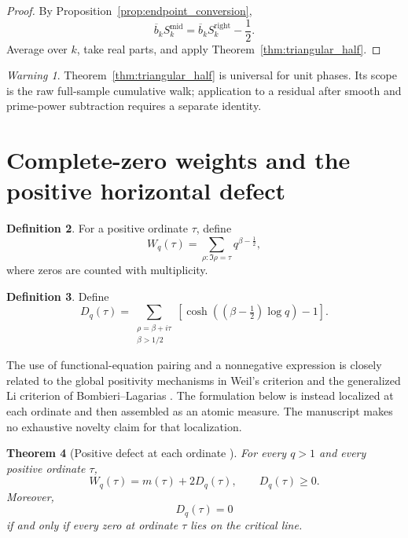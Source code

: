\documentclass[11pt]{amsart}
\numberwithin{equation}{section}
\theoremstyle{plain}
\newtheorem{theorem}{Theorem}[section]
\theoremstyle{definition}
\newtheorem{definition}[theorem]{Definition}
\theoremstyle{remark}
\newtheorem{warning}[theorem]{Warning}
\newcommand{\1}{\mathbf{1}}
\begin{document}
\begin{proof}
By Proposition~\ref{prop:endpoint_conversion},
\begin{equation}
\overline b_kS_k^{\mathrm{mid}}
=
\overline b_kS_k^{\mathrm{right}}-\frac12.
\label{eq:midpoint_corollary_step}
\end{equation}
Average over \(k\), take real parts, and apply
Theorem~\ref{thm:triangular_half}.
\end{proof}

\begin{warning}
\label{warn:triangular_scope}
Theorem~\ref{thm:triangular_half} is universal for unit phases.  Its scope is the raw full-sample cumulative walk; application to a residual after smooth and prime-power subtraction requires a separate identity.
\end{warning}

\section{Complete-zero weights and the positive horizontal defect}
\label{sec:positive_defect}

\begin{definition}
\label{def:complete_zero_weight}
For a positive ordinate \(\tau\), define
\begin{equation}
W_q(\tau)
=
\sum_{\rho:\Im\rho=\tau}
q^{\beta-\frac12},
\label{eq:Wq_definition}
\end{equation}
where zeros are counted with multiplicity.
\end{definition}

\begin{definition}
\label{def:Dq}
Define
\begin{equation}
D_q(\tau)
=
\sum_{\substack{\rho=\beta+i\tau\\\beta>1/2}}
\left[
\cosh\left((\beta-\tfrac12)\log q\right)-1
\right].
\label{eq:Dq_definition}
\end{equation}
\end{definition}


The use of functional-equation pairing and a nonnegative expression is
closely related to the global positivity mechanisms in Weil's criterion and
the generalized Li criterion of Bombieri--Lagarias
\cite{Weil1952,BombieriLagarias1999}.  The formulation below is instead
localized at each ordinate and then assembled as an atomic measure.  The
manuscript makes no exhaustive novelty claim for that localization.


\begin{theorem}[Positive defect at each ordinate {}]
\label{thm:positive_defect}
For every \(q>1\) and every positive ordinate \(\tau\),
\begin{equation}
\boxed{
W_q(\tau)=m(\tau)+2D_q(\tau),
\qquad
D_q(\tau)\geq0.
}
\label{eq:W_m_D}
\end{equation}
Moreover,
\begin{equation}
D_q(\tau)=0
\label{eq:Dq_zero_condition}
\end{equation}
if and only if every zero at ordinate \(\tau\) lies on the critical line.
\end{theorem}
\end{document}
